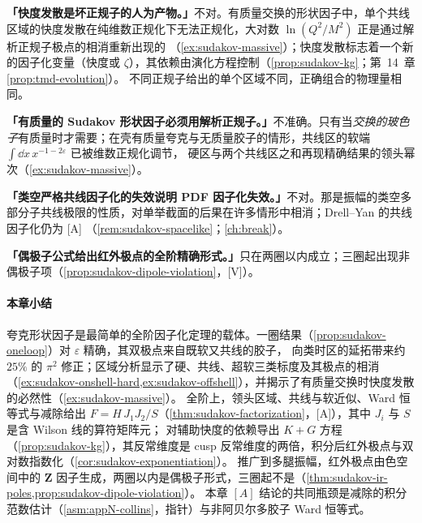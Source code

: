 \begin{tcolorbox}[enhanced,breakable,title=常见误解,fonttitle=\bfseries,
  colback=gray!3!white,colframe=gray!55!black,boxrule=0.6pt,arc=2pt,
  left=5pt,right=5pt,top=3pt,bottom=3pt,before skip=6pt,after skip=6pt]
\textbf{「快度发散是坏正规子的人为产物。」}不对。有质量交换的形状因子中，单个共线区域的快度发散在纯维数正规化下无法正规化，大对数 $\ln(Q^2/M^2)$ 正是通过解析正规子极点的相消重新出现的
（\cref{ex:sudakov-massive}）；快度发散标志着一个新的因子化变量（快度或 $\zeta$），其依赖由演化方程控制（\cref{prop:sudakov-kg}；第~14~章\cref{prop:tmd-evolution}）。
不同正规子给出的单个区域不同，正确组合的物理量相同。\par
\textbf{「有质量的 Sudakov 形状因子必须用解析正规子。」}不准确。只有当\emph{交换的玻色子}有质量时才需要；在壳有质量夸克与无质量胶子的情形，共线区的软端 $\int\dd x\,x^{-1-2\varepsilon}$ 已被维数正规化调节，
硬区与两个共线区之和再现精确结果的领头幂次（\cref{ex:sudakov-massive}）。\par
\textbf{「类空严格共线因子化的失效说明 PDF 因子化失效。」}不对。那是振幅的类空多部分子共线极限的性质，对单举截面的后果在许多情形中相消；Drell--Yan 的共线因子化仍为 [A]
（\cref{rem:sudakov-spacelike}；\cref{ch:break}）。\par
\textbf{「偶极子公式给出红外极点的全阶精确形式。」}只在两圈以内成立；三圈起出现非偶极子项（\cref{prop:sudakov-dipole-violation}，[V]）。
\end{tcolorbox}

\paragraph{本章小结}夸克形状因子是最简单的全阶因子化定理的载体。一圈结果（\cref{prop:sudakov-oneloop}）对 $\varepsilon$ 精确，其双极点来自既软又共线的胶子，
向类时区的延拓带来约 $25\%$ 的 $\pi^2$ 修正；区域分析显示了硬、共线、超软三类标度及其极点的相消（\cref{ex:sudakov-onshell-hard,ex:sudakov-offshell}），并揭示了有质量交换时快度发散的必然性（\cref{ex:sudakov-massive}）。
全阶上，领头区域、共线与软近似、Ward 恒等式与减除给出 $F=H\,J_1J_2/S$（\cref{thm:sudakov-factorization}，[A]），其中 $J_i$ 与 $S$ 是含 Wilson 线的算符矩阵元；
对辅助快度的依赖导出 $K+G$ 方程（\cref{prop:sudakov-kg}），其反常维度是 cusp 反常维度的两倍，积分后红外极点与双对数指数化（\cref{cor:sudakov-exponentiation}）。
推广到多腿振幅，红外极点由色空间中的 $\mathbf Z$ 因子生成，两圈以内是偶极子形式，三圈起不是（\cref{thm:sudakov-ir-poles,prop:sudakov-dipole-violation}）。
本章 $[A]$ 结论的共同瓶颈是减除的积分范数估计（\cref{asm:appN-collins}，指针）与非阿贝尔多胶子 Ward 恒等式。


